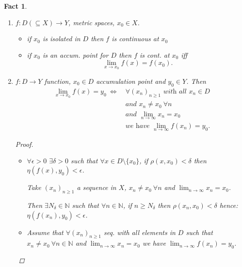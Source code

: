 \documentclass[12pt]{amsbook}
\newtheorem{fact}[theorem]{Fact}
\theoremstyle{definition}
\newcommand{\NN}{{\mathbb N}}
\newcommand{\Ra}{\Rightarrow} %
\newcommand{\La}{\Leftarrow} %
\newcommand{\Lra}{\Leftrightarrow} %
\newcommand{\ra}{\rightarrow} %
\begin{document}
\begin{fact} \
\begin{enumerate}
\item $f: D \left(\subseteq X\right) \ra Y$, metric spaces, $x_0 \in X$. %
    \begin{itemize}
    \item[(i)] if $x_0$ is isolated in $D$ then $f$ is continuous at $x_0$
    \item[(ii)] if $x_0$ is an accum. point for $D$ then $f$ is cont. at $x_0$ iff \begin{equation*}\lim_{x \ra x_0} f(x) = f(x_0).\end{equation*}
    \end{itemize}
\item $f: D \ra Y$ function, $x_0 \in D$ accumulation point and $y_0 \in Y$. Then
    \begin{align}
    \lim_{x \ra x_0} f(x) = y_0 \ \Lra \ \nonumber
    & \forall (x_n)_{n \geq 1} \textit{ with all } x_n \in D \\ \nonumber
    & \textit{and } x_n \neq x_0 \ \forall n \\ \nonumber
    & \textit{and } \lim_{n \ra \infty} x_n = x_0 \\ \nonumber
    & \textit{we have } \lim_{n \ra \infty} f(x_n) = y_0.
    \end{align}
    
    \begin{proof}
    
    \begin{itemize}
    \item["$\Ra$"] $\forall \epsilon > 0$ $\exists \delta > 0$ such that $\forall x \in D \setminus \{x_0\}$, if $\rho(x, x_0) < \delta$ then $\eta(f(x), y_0) < \epsilon$.
    
    Take $(x_n)_{n \geq 1}$ a sequence in $X$, $x_n \neq x_0 \ \forall n$ and $\lim_{n \ra \infty} x_n = x_0$.
    
    Then $\exists N_\delta \in \NN$ such that $\forall n \in \NN$, if $n \geq N_\delta$ then $\rho(x_n, x_0) < \delta$ hence: $\eta(f(x_n), y_0) < \epsilon$.
    
    
    \item["$\La$"] Assume that $\forall (x_n)_{n \geq 1}$ seq. with all elements in $D$ such that $x_n \neq x_0 \ \forall n \in \NN$
    and $\lim_{n \ra \infty} x_n = x_0$ we have $\lim_{n \ra \infty} f(x_n) = y_0$.
    

\end{itemize}
\end{proof}
\end{enumerate}
\end{fact}
\end{document}
